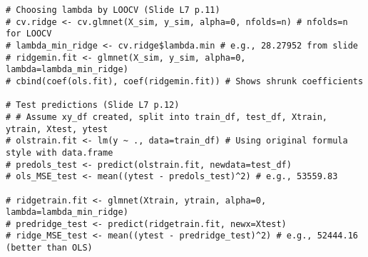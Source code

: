 \documentclass[12pt,a4paper]{article}
\begin{document}
\begin{itemize}
\begin{itemize}
\begin{itemize}
\begin{itemize}
\begin{lstlisting}[caption={Ridge Regression Example (Simulated Data, Slides L7 p.6-12)}]
# Choosing lambda by LOOCV (Slide L7 p.11)
# cv.ridge <- cv.glmnet(X_sim, y_sim, alpha=0, nfolds=n) # nfolds=n for LOOCV
# lambda_min_ridge <- cv.ridge$lambda.min # e.g., 28.27952 from slide
# ridgemin.fit <- glmnet(X_sim, y_sim, alpha=0, lambda=lambda_min_ridge)
# cbind(coef(ols.fit), coef(ridgemin.fit)) # Shows shrunk coefficients

# Test predictions (Slide L7 p.12)
# # Assume xy_df created, split into train_df, test_df, Xtrain, ytrain, Xtest, ytest
# olstrain.fit <- lm(y ~ ., data=train_df) # Using original formula style with data.frame
# predols_test <- predict(olstrain.fit, newdata=test_df)
# ols_MSE_test <- mean((ytest - predols_test)^2) # e.g., 53559.83

# ridgetrain.fit <- glmnet(Xtrain, ytrain, alpha=0, lambda=lambda_min_ridge)
# predridge_test <- predict(ridgetrain.fit, newx=Xtest)
# ridge_MSE_test <- mean((ytest - predridge_test)^2) # e.g., 52444.16 (better than OLS)
\end{lstlisting}
                \end{itemize}
        \end{itemize}


\end{itemize}
\end{itemize}
\end{document}
